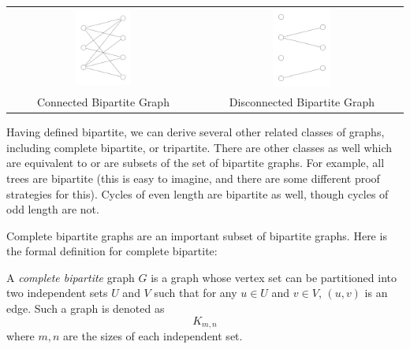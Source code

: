 \begin{center}
    \begin{tabular}{c c}
        \includegraphics[width=0.3\textwidth]{Project3/Bipartite/bip.pdf} & \includegraphics[width=0.3\textwidth]{Project3/Bipartite/forest.pdf} \\
        Connected Bipartite Graph & Disconnected Bipartite Graph
    \end{tabular}
\end{center}

Having defined bipartite, we can derive several other related classes of graphs, including complete bipartite, or tripartite. There are other classes as well which are equivalent to or are subsets of the set of bipartite graphs. For example, all trees are bipartite (this is easy to imagine, and there are some different proof strategies for this). Cycles of even length are bipartite as well, though cycles of odd length are not. 

Complete bipartite graphs are an important subset of bipartite graphs. Here is the formal definition for complete bipartite:

\begin{definition}
    A \textit{complete bipartite} graph $G$ is a graph whose vertex set can be partitioned into two independent sets $U$ and $V$ such that for any $u \in U$ and $v \in V$, $(u, v)$ is an edge. Such a graph is denoted as \[ K_{m,n} \] where $m, n$ are the sizes of each independent set.
\end{definition}

